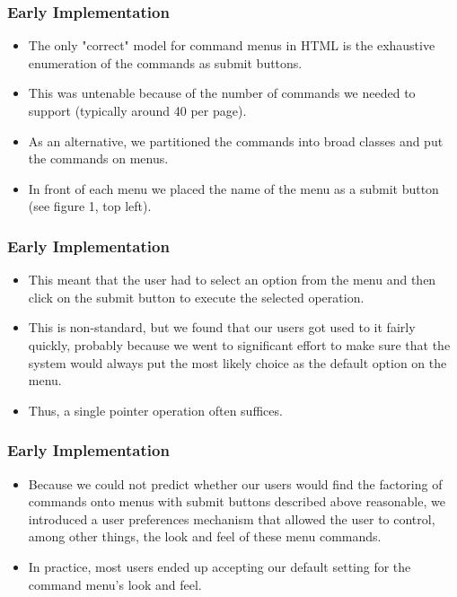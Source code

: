 \documentclass{beamer}
\begin{document}
\begin{frame}
\frametitle{Early Implementation}

\begin{itemize}
\item The only "correct" model for command menus in HTML is the exhaustive enumeration of the commands as submit buttons.
\item This was untenable because of the number of commands we needed to support (typically around 40 per page).
\item As an alternative, we partitioned the commands into broad classes and put the commands on menus.
\item In front of each menu we placed the name of the menu as a submit button (see figure 1, top left).
\end{itemize}

\end{frame}

\begin{frame}
\frametitle{Early Implementation}

\begin{itemize}
\item This meant that the user had to select an option from the menu and then click on the submit button to execute the selected operation.
\item This is non-standard, but we found that our users got used to it fairly quickly, probably because we went to significant effort to make sure that the system would always put the most likely choice as the default option on the menu.
\item Thus, a single pointer operation often suffices.
\end{itemize}

\end{frame}

\begin{frame}
\frametitle{Early Implementation}

\begin{itemize}
\item Because we could not predict whether our users would find the factoring of commands onto menus with submit buttons described above reasonable, we introduced a user preferences mechanism that allowed the user to control, among other things, the look and feel of these menu commands.
\item In practice, most users ended up accepting our default setting for the command menu's look and feel.
\end{itemize}

\end{frame}
\end{document}
